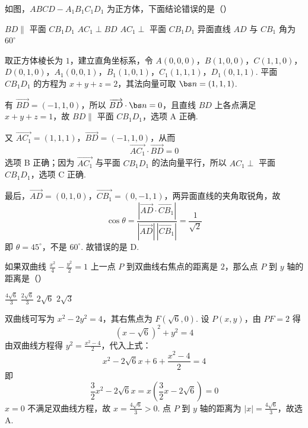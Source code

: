 \begin{problem}
如图，\(ABCD - A_{1}B_{1}C_{1}D_{1}\) 为正方体，下面结论错误的是（\quad）


\choices
    {\(BD \parallel\) 平面 \(CB_{1}D_{1}\)}
    {\(AC_{1} \perp BD\)}
    {\(AC_{1} \perp\) 平面 \(CB_{1}D_{1}\)}
    {异面直线 \(AD\) 与 \(CB_{1}\) 角为 \(60^{\circ}\)}
\end{problem}


\begin{solution}
取正方体棱长为 \(1\)，建立直角坐标系，令 \(A(0,0,0)\)，\(B(1,0,0)\)，\(C(1,1,0)\)，\(D(0,1,0)\)，\(A_1(0,0,1)\)，\(B_1(1,0,1)\)，\(C_1(1,1,1)\)，\(D_1(0,1,1)\).
平面 \(CB_1D_1\) 的方程为 \(x+y+z=2\)，其法向量可取 \(\bs n=(1,1,1)\).

有 \(\overrightarrow{BD}=(-1,1,0)\)，所以 \(\overrightarrow{BD}\cdot\bs n=0\)，且直线 \(BD\) 上各点满足 \(x+y+z=1\)，故 \(BD\parallel\) 平面 \(CB_1D_1\)，选项 A 正确.

又 \(\overrightarrow{AC_1}=(1,1,1)\)，\(\overrightarrow{BD}=(-1,1,0)\)，从而
\[
\overrightarrow{AC_1}\cdot\overrightarrow{BD}=0
\]
选项 B 正确；因为 \(\overrightarrow{AC_1}\) 与平面 \(CB_1D_1\) 的法向量平行，所以 \(AC_1\perp\) 平面 \(CB_1D_1\)，选项 C 正确.

最后，\(\overrightarrow{AD}=(0,1,0)\)，\(\overrightarrow{CB_1}=(0,-1,1)\)，两异面直线的夹角取锐角，故
\[
\cos\theta=\frac{|\overrightarrow{AD}\cdot\overrightarrow{CB_1}|}{|\overrightarrow{AD}|\,|\overrightarrow{CB_1}|}=\frac1{\sqrt2}
\]
即 \(\theta=45^\circ\)，不是 \(60^\circ\). 故错误的是 D.
\end{solution}

\begin{problem}
如果双曲线 \(\frac{x^2}{4} - \frac{y^2}{2} = 1\) 上一点 \(P\) 到双曲线右焦点的距离是 \(2\)，那么点 \(P\) 到 \(y\) 轴的距离是（\quad）

\choices
    {\(\frac{4\sqrt{6}}{3}\)}
    {\(\frac{2\sqrt{6}}{3}\)}
    {\(2\sqrt{6}\)}
    {\(2\sqrt{3}\)}
\end{problem}


\begin{solution}
双曲线可写为 \(x^2-2y^2=4\)，其右焦点为 \(F(\sqrt6,0)\). 设 \(P(x,y)\)，由 \(PF=2\) 得
\[
(x-\sqrt6)^2+y^2=4
\]
由双曲线方程得 \(y^2=\frac{x^2-4}{2}\)，代入上式：
\[
x^2-2\sqrt6x+6+\frac{x^2-4}{2}=4
\]
即
\[
\frac32x^2-2\sqrt6x=x\left(\frac32x-2\sqrt6\right)=0
\]
\(x=0\) 不满足双曲线方程，故 \(x=\frac{4\sqrt6}{3}>0\). 点 \(P\) 到 \(y\) 轴的距离为 \(|x|=\frac{4\sqrt6}{3}\)，故选 A.
\end{solution}

